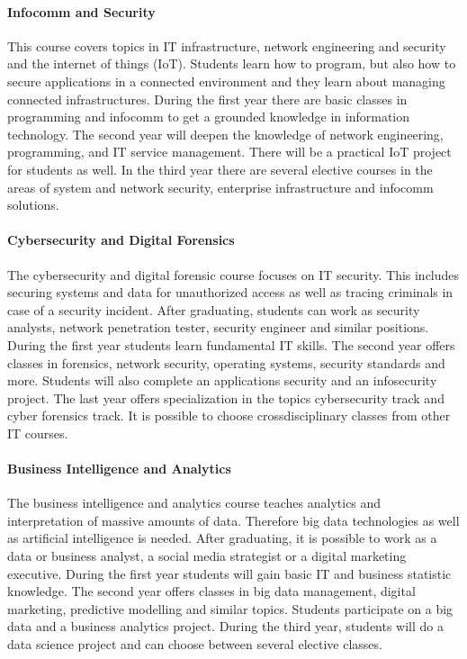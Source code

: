 \paragraph{Infocomm and Security}
This course covers topics in IT infrastructure, network engineering and security and the internet of things (IoT). Students learn how to program, but also how to secure applications in a connected environment and they learn about managing connected infrastructures. During the first year there are basic classes in programming and infocomm to get a grounded knowledge in information technology. The second year will deepen the knowledge of network engineering, programming, and IT service management. There will be a practical IoT project for students as well.
In the third year there are several elective courses in the areas of system and network security, enterprise infrastructure and infocomm solutions.

\paragraph{Cybersecurity and Digital Forensics}
The cybersecurity and digital forensic course focuses on IT security. This includes securing systems and data for unauthorized access as well as tracing criminals in case of a security incident. After graduating, students can work as security analysts, network penetration tester, security engineer and similar positions. During the first year students learn fundamental IT skills. The second year offers classes in forensics, network security, operating systems, security standards and more. Students will also complete an applications security and an infosecurity project.
The last year offers specialization in the topics cybersecurity track and cyber forensics track. It is possible to choose crossdisciplinary classes from other IT courses.

\paragraph{Business Intelligence and Analytics}
The business intelligence and analytics course teaches analytics and interpretation of massive amounts of data. Therefore big data technologies as well as artificial intelligence is needed. After graduating, it is possible to work as a data or business analyst, a social media strategist or a digital marketing executive. During the first year students will gain basic IT and business statistic knowledge. The second year offers classes in big data management, digital marketing, predictive modelling and similar topics. Students participate on a big data and a business analytics project.
During the third year, students will do a data science project and can choose between several elective classes.

